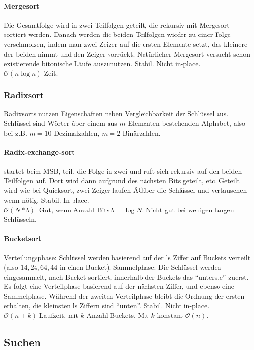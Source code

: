 \documentclass[a4paper, 9pt, DIV=20]{scrartcl}
\newcommand{\Oh}{\mathcal{O}}
\begin{document}
\paragraph{Mergesort} Die Gesamtfolge wird in zwei Teilfolgen geteilt, die rekursiv mit Mergesort sortiert werden. Danach werden die beiden Teilfolgen wieder zu einer Folge verschmolzen, indem man zwei Zeiger auf die ersten Elemente setzt, das kleinere der beiden nimmt und den Zeiger vorrückt. Natürlicher Mergesort versucht schon existierende bitonische Läufe auszunutzen. Stabil. Nicht in-place. \\
$\Oh(n\log{n})$ Zeit.

\subsubsection{Radixsort}
Radixsorts nutzen Eigenschaften neben Vergleichbarkeit der Schlüssel aus. Schlüssel sind Wörter über einem aus $m$ Elementen bestehenden Alphabet, also bei z.B. $m=10$ Dezimalzahlen, $m=2$ Binärzahlen.

\paragraph{Radix-exchange-sort} startet beim MSB, teilt die Folge in zwei und ruft sich rekursiv auf den beiden Teilfolgen auf. Dort wird dann aufgrund des nächsten Bits geteilt, etc. Geteilt wird wie bei Quicksort, zwei Zeiger laufen ÃŒber die Schlüssel und vertauschen wenn nötig. Stabil. In-place. \\
$\Oh(N * b)$. Gut, wenn Anzahl Bits $b = \log{N}$. Nicht gut bei wenigen langen Schlüsseln.

\paragraph{Bucketsort} Verteilungsphase: Schlüssel werden basierend auf der ls Ziffer auf Buckets verteilt (also $14, 24, 64, 44$ in einen Bucket). Sammelphase: Die Schlüssel werden eingesammelt, nach Bucket sortiert, innerhalb der Buckets das ``unterste'' zuerst. Es folgt eine Verteilphase basierend auf der nächsten Ziffer, und ebenso eine Sammelphase. Während der zweiten Verteilphase bleibt die Ordnung der ersten erhalten, die kleinsten ls Ziffern sind ``unten''. Stabil. Nicht in-place. \\
$\Oh(n+k)$ Laufzeit, mit $k$ Anzahl Buckets. Mit $k$ konstant $\Oh(n)$.

\subsection{Suchen}
\end{document}
